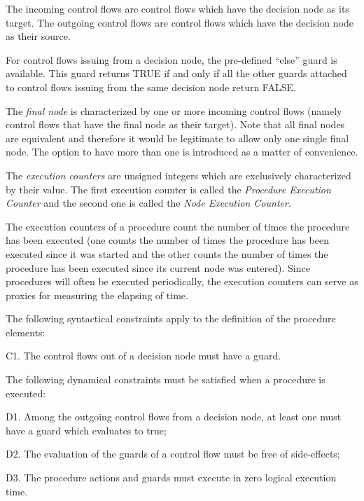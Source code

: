 \documentclass[definition]{../fwprofile}
\begin{document}
The incoming control flows are control flows which have the decision node as its target. The
outgoing control flows are control flows which have the decision node as their source.

For control flows issuing from a decision node, the pre-defined “else” guard is available. This
guard returns TRUE if and only if all the other guards attached to control flows issuing from
the same decision node return FALSE.

The \emph{final node} is characterized by one or more incoming control flows (namely control flows
that have the final node as their target). Note that all final nodes are equivalent and therefore it
would be legitimate to allow only one single final node. The option to have more than one is
introduced as a matter of convenience.

The \emph{execution counters} are unsigned integers which are exclusively characterized by their value. The first execution counter is called the \emph{Procedure Execution Counter} and the second one is called the \emph{Node Execution Counter}.

The execution counters of a procedure count the number of times the procedure has
been executed (one counts the number of times the procedure has been executed since it 
was started and the other counts the number of times the procedure has been executed
since its current node was entered). Since procedures will often be executed periodically,
the execution counters can serve as proxies for measuring the elapsing of time.

The following syntactical constraints apply to the definition of the procedure elements:

\begin{fw_itemize} 
\item C1. The control flows out of a decision node must have a guard.
\end{fw_itemize}

The following dynamical constraints must be satisfied when a procedure is executed:
\begin{fw_itemize} 
\item D1. Among the outgoing control flows from a decision node, at least one must have a
guard which evaluates to true;
\item D2. The evaluation of the guards of a control flow must be free of side-effects;
\item D3. The procedure actions and guards must execute in zero logical execution time.
\end{fw_itemize}
\end{document}
